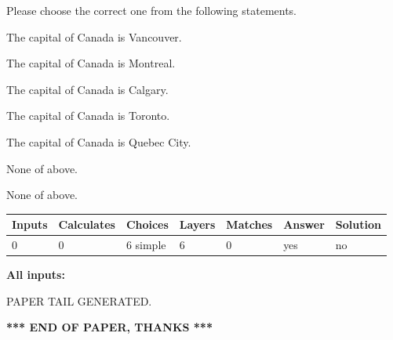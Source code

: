 \documentclass[12pt]{article}
\begin{document}
  
Please choose the correct one from the following statements.
 
 
The capital of Canada is Vancouver.
 
 
The capital of Canada is Montreal.
 
 
The capital of Canada is Calgary.
 
 
The capital of Canada is Toronto.
 
 
The capital of Canada is Quebec City.
 
 
 None of above.
 
 
\noindent{}
 
 
 None of above.
 
 
\noindent{}
 
 
   
   
   
   
\noindent\begin{tabular}{|l|l|l|l|l|l|l|}
 \hline
Inputs & Calculates & Choices & Layers & Matches & Answer & Solution \\ \hline
 0  & 
 0  & 
 6
  simple  
  & 
 6  & 
 0  & 
  yes & 
  no 
  \\ \hline
 \end{tabular}
   
   
   
   
\noindent{}
   
   
   
   
\noindent\vspace{0.1in}\hspace{-0.08in} {\textbf{\Large{All inputs: }}}
   
   
   
   
   
   
 \vspace{0.2in}
 
   
   
\vspace{2.0in} PAPER TAIL GENERATED.
   
   
   
   
\vspace{1.0in} 
{\textbf{\large{ *** END OF PAPER, THANKS *** }}} 
   
\end{document}
